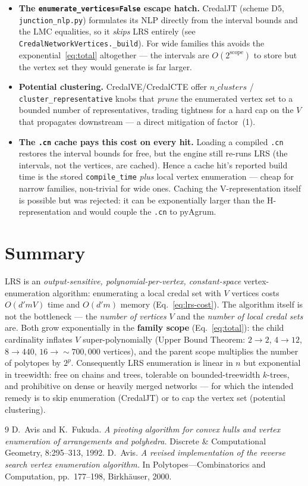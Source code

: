 \documentclass[11pt]{article}
\begin{document}
\begin{itemize}
  \item \textbf{The \texttt{enumerate\_vertices=False} escape hatch.} CredalJT (scheme D5,
    \texttt{junction\_nlp.py}) formulates its NLP directly from the interval bounds and the
    LMC equalities, so it \emph{skips} LRS entirely (see
    \texttt{CredalNetworkVertices.\_build}). For wide families this avoids the
    exponential~\eqref{eq:total} altogether --- the intervals are $O(2^{\text{scope}})$ to
    store but the vertex set they would generate is far larger.
  \item \textbf{Potential clustering.} CredalVE/CredalCTE offer $n\_clusters$ /
    \texttt{cluster\_representative} knobs that \emph{prune} the enumerated vertex set to a
    bounded number of representatives, trading tightness for a hard cap on the $V$ that
    propagates downstream --- a direct mitigation of factor~(1).
  \item \textbf{The \texttt{.cn} cache pays this cost on every hit.} Loading a compiled
    \texttt{.cn} restores the interval bounds for free, but the engine still re-runs LRS
    (the intervals, not the vertices, are cached). Hence a cache hit's reported build time
    is the stored \texttt{compile\_time} \emph{plus} local vertex enumeration --- cheap for
    narrow families, non-trivial for wide ones. Caching the V-representation itself is
    possible but was rejected: it can be exponentially larger than the H-representation and
    would couple the \texttt{.cn} to pyAgrum.
\end{itemize}

\section{Summary}

LRS is an \emph{output-sensitive, polynomial-per-vertex, constant-space} vertex-enumeration
algorithm: enumerating a local credal set with $V$ vertices costs $O(d' m V)$ time and
$O(d' m)$ memory (Eq.~\eqref{eq:lrs-cost}). The algorithm itself is not the bottleneck ---
the \emph{number of vertices} $V$ and the \emph{number of local credal sets} are. Both grow
exponentially in the \textbf{family scope} (Eq.~\eqref{eq:total}): the child cardinality
inflates $V$ super-polynomially (Upper Bound Theorem: $2\to2$, $4\to12$, $8\to440$,
$16\to\sim\!700{,}000$ vertices), and the parent scope multiplies the number of polytopes by
$2^{p}$. Consequently LRS enumeration is linear in $n$ but exponential in treewidth: free on
chains and trees, tolerable on bounded-treewidth $k$-trees, and prohibitive on dense or
heavily merged networks --- for which the intended remedy is to skip enumeration (CredalJT)
or to cap the vertex set (potential clustering).

\begin{thebibliography}{9}
  D.~Avis and K.~Fukuda.
  \emph{A pivoting algorithm for convex hulls and vertex enumeration of arrangements
  and polyhedra.}
  Discrete \& Computational Geometry, 8:295--313, 1992.
  D.~Avis.
  \emph{A revised implementation of the reverse search vertex enumeration algorithm.}
  In Polytopes---Combinatorics and Computation, pp.~177--198, Birkh\"auser, 2000.
\end{thebibliography}
\end{document}
